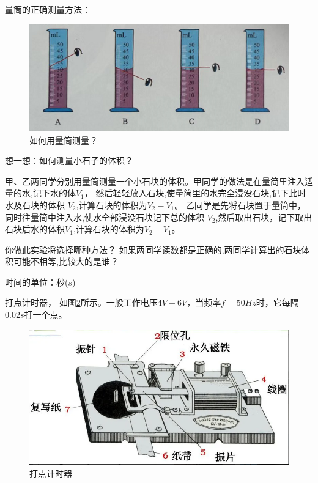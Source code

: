 \documentclass[windows,csize4]{BHCexam}
\begin{document}
\begin{groups}
量筒的正确测量方法：

\begin{figure}[htb]
    \centering
    \includegraphics [scale=0.5,trim=0 0 0 0]{./image/fig_1_13.PNG}
    \caption{如何用量筒测量？} 
    \label{fig:fig_1_13}
\end{figure}
想一想：如何测量小石子的体积？

\question[5]甲、乙两同学分别用量筒测量一个小石块的体积。甲同学的做法是在量简里注入适量的水,记下水的体$V_1$，
然后轻轻放入石块,使量简里的水完全浸没石块,记下此时水及石块的体积 $V_2$,计算石块的体积为$V_2-V_1$。
乙同学是先将石块置于量筒中，同时往量筒中注入水,使水全部浸没石块记下总的体积 $V_2$,然后取出石块，记下取出石块后水的体积$V_1$,计算石块的体积为$V_2-V_1$。
\begin{subquestions}
    \subquestion 你做此实验将选择哪种方法？
    \subquestion 如果两同学读数都是正确的,两同学计算出的石块体积可能不相等,比较大的是谁？
\end{subquestions}
\begin{solution}{0.5cm}
    \methodonly
\end{solution}

 时间的单位：秒($s$)
 
 打点计时器， 如图\ref{fig:fig_1_14}所示。一般工作电压$4V-6V$，当频率$f=50Hz$时，它每隔$0.02s$打一个点。
 \begin{figure}[htb]
    \centering
    \includegraphics [scale=0.5,trim=0 0 0 0]{./image/fig_1_14.PNG}
    \caption{打点计时器} 
    \label{fig:fig_1_14}
\end{figure}


\end{groups}
\end{document}
